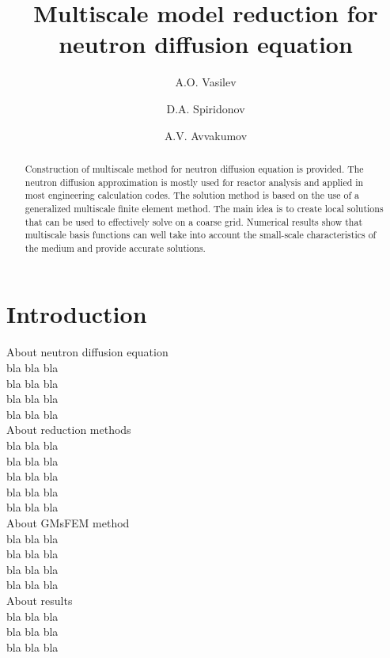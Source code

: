 \documentclass[runningheads]{llncs}
\begin{document}
%
\title{Multiscale model reduction for neutron diffusion equation}
%
%
\author{A.O. Vasilev \and 
D.A. Spiridonov \and
A.V. Avvakumov }
%
%
%
\maketitle              %
%
\begin{abstract}
Construction of multiscale method for neutron diffusion equation is provided. 
The neutron diffusion approximation is mostly used for reactor analysis and applied in most engineering calculation codes. 
The solution method is based on the use of a generalized multiscale finite element method.
The main idea is to create local solutions that can be used to effectively solve on a coarse grid.
Numerical results show that multiscale basis functions can well take into account the small-scale characteristics of the medium and provide accurate solutions. 

\end{abstract}

\section{Introduction}
About neutron diffusion equation \\
bla bla bla \\
bla bla bla \\
bla bla bla \\
bla bla bla \\
About reduction methods \\
bla bla bla \\
bla bla bla \\
bla bla bla \\
bla bla bla \\
bla bla bla \\
About GMsFEM method \\
bla bla bla \\
bla bla bla \\
bla bla bla \\
bla bla bla \\
About results \\
bla bla bla \\
bla bla bla \\
bla bla bla \\
\end{document}
